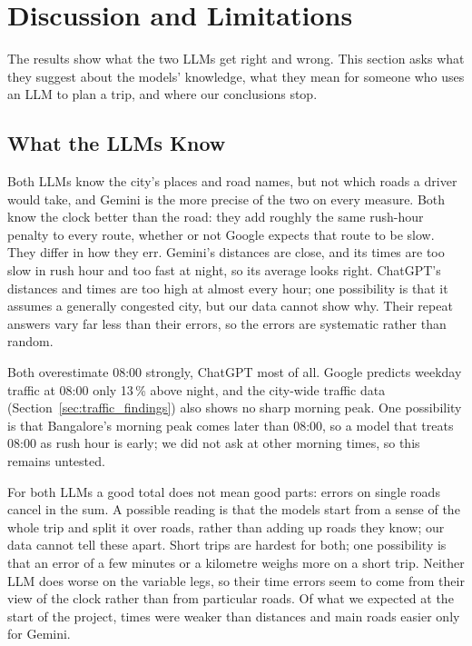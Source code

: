 \documentclass[conference]{IEEEtran}
\begin{document}
\section{Discussion and Limitations}\label{sec:discussion}

The results show what the two LLMs get right and wrong. This section asks what they suggest about the models' knowledge, what they mean for someone who uses an LLM to plan a trip, and where our conclusions stop.

\subsection{What the LLMs Know}
Both LLMs know the city's places and road names, but not which roads a driver would take, and Gemini is the more precise of the two on every measure. Both know the clock better than the road: they add roughly the same rush-hour penalty to every route, whether or not Google expects that route to be slow. They differ in how they err. Gemini's distances are close, and its times are too slow in rush hour and too fast at night, so its average looks right. ChatGPT's distances and times are too high at almost every hour; one possibility is that it assumes a generally congested city, but our data cannot show why. Their repeat answers vary far less than their errors, so the errors are systematic rather than random.

Both overestimate 08:00 strongly, ChatGPT most of all. Google predicts weekday traffic at 08:00 only 13\,\% above night, and the city-wide traffic data (Section~\ref{sec:traffic_findings}) also shows no sharp morning peak. One possibility is that Bangalore's morning peak comes later than 08:00, so a model that treats 08:00 as rush hour is early; we did not ask at other morning times, so this remains untested.

For both LLMs a good total does not mean good parts: errors on single roads cancel in the sum. A possible reading is that the models start from a sense of the whole trip and split it over roads, rather than adding up roads they know; our data cannot tell these apart. Short trips are hardest for both; one possibility is that an error of a few minutes or a kilometre weighs more on a short trip. Neither LLM does worse on the variable legs, so their time errors seem to come from their view of the clock rather than from particular roads. Of what we expected at the start of the project, times were weaker than distances and main roads easier only for Gemini.
\end{document}
